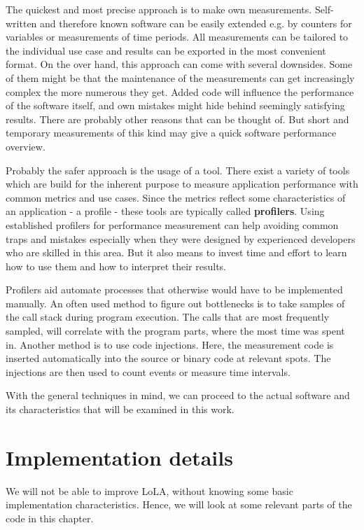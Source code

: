 The quickest and most precise approach is to make own measurements. Self-written and therefore known software can be easily extended e.g. by counters for variables or measurements of time periods. All measurements can be tailored to the individual use case and results can be exported in the most convenient format. On the over hand, this approach can come with several downsides. Some of them might be that the maintenance of the measurements can get increasingly complex the more numerous they get. Added code will influence the performance of the software itself, and own mistakes might hide behind seemingly satisfying results. There are probably other reasons that can be thought of. But short and temporary measurements of this kind may give a quick software performance overview.

Probably the safer approach is the usage of a tool. There exist a variety of tools which are build for the inherent purpose to measure application performance with common metrics and use cases. Since the metrics reflect some characteristics of an application - a profile - these tools are typically called \textbf{profilers}. Using established profilers for performance measurement can help avoiding common traps and mistakes especially when they were designed by experienced developers who are skilled in this area. But it also means to invest time and effort to learn how to use them and how to interpret their results.

Profilers aid automate processes that otherwise would have to be implemented manually. An often used method to figure out bottlenecks is to take samples of the call stack during program execution. The calls that are most frequently sampled, will correlate with the program parts, where the most time was spent in. Another method is to use code injections. Here, the measurement code is inserted automatically into the source or binary code at relevant spots. The injections are then used to count events or measure time intervals.

With the general techniques in mind, we can proceed to the actual software and its characteristics that will be examined in this work.

\section{Implementation details}
We will not be able to improve LoLA, without knowing some basic implementation characteristics. Hence, we will look at some relevant parts of the code in this chapter.

